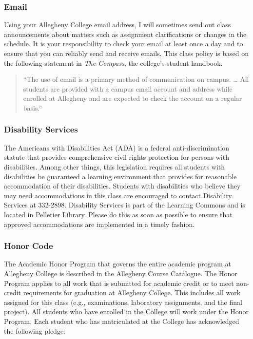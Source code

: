 \subsubsection*{Email}

Using your Allegheny College email address, I will sometimes send out class announcements about matters such as
assignment clarifications or changes in the schedule. It is your responsibility to check your email at least once a day
and to ensure that you can reliably send and receive emails. This class policy is based on the following statement in
{\em The Compass}, the college's student handbook.

\vspace*{-.1in}
\begin{quote}
``The use of email is a primary method of communication on campus. \ldots
All students are provided with a campus email account and address while
enrolled at Allegheny and are expected to check the account on a regular
basis.'' 
\end{quote}
\vspace*{-.15in}

\subsubsection*{Disability Services}

The Americans with Disabilities Act (ADA) is a federal anti-discrimination statute that provides comprehensive civil
rights protection for persons with disabilities.  Among other things, this legislation requires all students with
disabilities be guaranteed a learning environment that provides for reasonable accommodation of their disabilities.
Students with disabilities who believe they may need accommodations in this class are encouraged to contact Disability
Services at 332-2898.  Disability Services is part of the Learning Commons and is located in Pelletier Library.
Please do this as soon as possible to ensure that approved accommodations are implemented in a timely fashion.

\subsubsection*{Honor Code}

The Academic Honor Program that governs the entire academic program at Allegheny College is described in the Allegheny
Course Catalogue.  The Honor Program applies to all work that is submitted for academic credit or to meet non-credit
requirements for graduation at Allegheny College.  This includes all work assigned for this class (e.g., examinations,
laboratory assignments, and the final project).  All students who have enrolled in the College will work under the Honor
Program.  Each student who has matriculated at the College has acknowledged the following pledge:

